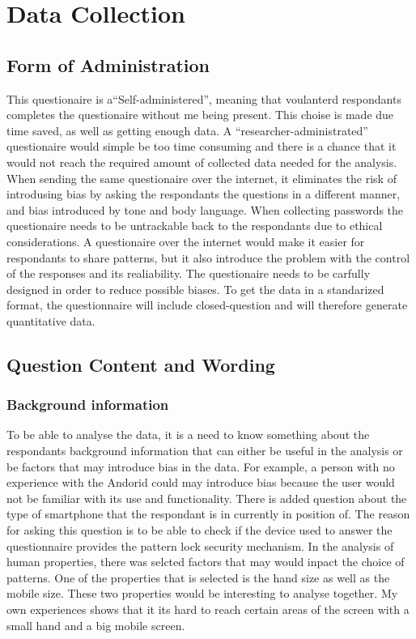 \section{Data Collection}

  \subsection{Form of Administration}

    This questionaire is a``Self-administered'', meaning that voulanterd respondants completes the questionaire without me being present. This choise is made due time saved, as well as getting enough data. A ``researcher-administrated'' questionaire would simple be too time consuming and there is a chance that it would not reach the required amount of collected data needed for the analysis. When sending the same questionaire over the internet, it eliminates the risk of introdusing bias by asking the respondants the questions in a different manner, and bias introduced by tone and body language. When collecting passwords the questionaire needs to be untrackable back to the respondants due to ethical considerations. A questionaire over the internet would make it easier for respondants to share patterns, but it also introduce the problem with the control of the responses and its realiability. The questionaire needs to be carfully designed in order to reduce possible biases. To get the data in a standarized format, the questionnaire will include closed-question and will therefore generate quantitative data. 

  \subsection{Question Content and Wording}

    \subsubsection*{Background information}
    To be able to analyse the data, it is a need to know something about the respondants background information that can either be useful in the analysis or be factors that may introduce bias in the data. For example, a person with no experience with the Andorid could may introduce bias because the user would not be familiar with its use and functionality. There is added question about the type of smartphone that the respondant is in currently in position of. The reason for asking this question is to be able to  check if the device used to answer the questionnaire provides the pattern lock security mechanism. In the analysis of human properties, there was selcted factors that may would inpact the choice of patterns. One of the properties that is selected is the hand size as well as the mobile size. These two properties would be interesting to analyse together. My own experiences shows that it its hard to reach certain areas of the screen with a small hand and a big mobile screen. \\

